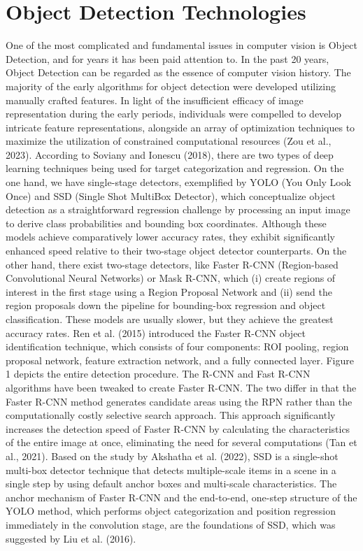 \section{Object Detection Technologies}
One of the most complicated and fundamental issues in computer vision is Object Detection, and for years it has been paid attention to. In the past 20 years, Object Detection can be regarded as the essence of computer vision history. The majority of the early algorithms for object detection were developed utilizing manually crafted features. In light of the insufficient efficacy of image representation during the early periods, individuals were compelled to develop intricate feature representations, alongside an array of optimization techniques to maximize the utilization of constrained computational resources (Zou et al., 2023). 
According to Soviany and Ionescu (2018), there are two types of deep learning techniques being used for target categorization and regression. On the one hand, we have single-stage detectors, exemplified by YOLO (You Only Look Once) and SSD (Single Shot MultiBox Detector), which conceptualize object detection as a straightforward regression challenge by processing an input image to derive class probabilities and bounding box coordinates. Although these models achieve comparatively lower accuracy rates, they exhibit significantly enhanced speed relative to their two-stage object detector counterparts. On the other hand, there exist two-stage detectors, like Faster R-CNN (Region-based Convolutional Neural Networks) or Mask R-CNN, which (i) create regions of interest in the first stage using a Region Proposal Network and (ii) send the region proposals down the pipeline for bounding-box regression and object classification. These models are usually slower, but they achieve the greatest accuracy rates.
Ren et al. (2015) introduced the Faster R-CNN object identification technique, which consists of four components: ROI pooling, region proposal network, feature extraction network, and a fully connected layer. Figure 1 depicts the entire detection procedure. The R-CNN and Fast R-CNN algorithms have been tweaked to create Faster R-CNN. The two differ in that the Faster R-CNN method generates candidate areas using the RPN rather than the computationally costly selective search approach. This approach significantly increases the detection speed of Faster R-CNN by calculating the characteristics of the entire image at once, eliminating the need for several computations (Tan et al., 2021).
Based on the study by Akshatha et al. (2022), SSD is a single-shot multi-box detector technique that detects multiple-scale items in a scene in a single step by using default anchor boxes and multi-scale characteristics. The anchor mechanism of Faster R-CNN and the end-to-end, one-step structure of the YOLO method, which performs object categorization and position regression immediately in the convolution stage, are the foundations of SSD, which was suggested by Liu et al. (2016).
